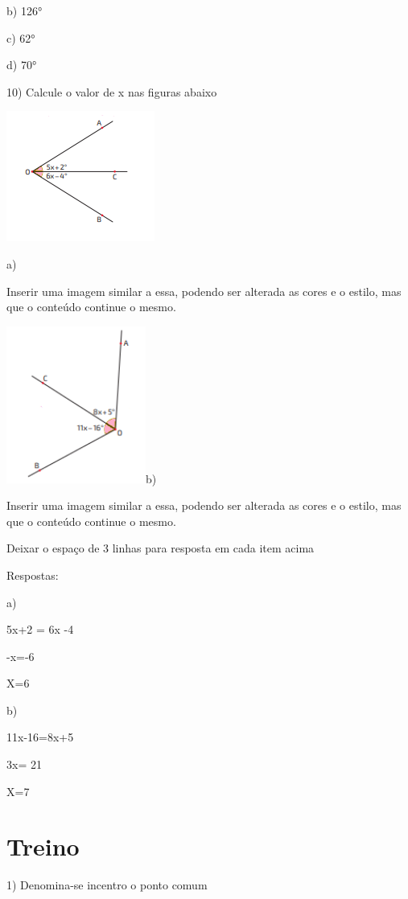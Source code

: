b) 126°

c) 62°

d) 70°

10) Calcule o valor de x nas figuras abaixo

\includegraphics[width=1.91667in,height=1.6875in]{./imgSAEB_8_MAT/media/image33.png}

a)

Inserir uma imagem similar a essa, podendo ser alterada as cores e o
estilo, mas que o conteúdo continue o mesmo.

\includegraphics[width=1.80208in,height=2.02917in]{./imgSAEB_8_MAT/media/image34.png}b)

Inserir uma imagem similar a essa, podendo ser alterada as cores e o
estilo, mas que o conteúdo continue o mesmo.

Deixar o espaço de 3 linhas para resposta em cada item acima

Respostas:

a)

5x+2 = 6x -4

-x=-6

X=6

b)

11x-16=8x+5

3x= 21

X=7

\section{Treino}

1) Denomina-se incentro o ponto comum

